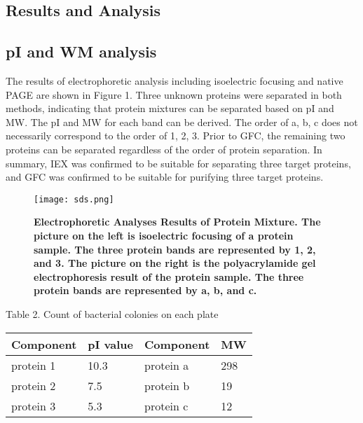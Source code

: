 \documentclass[a4paper,10pt]{article}
\begin{document}
\begin{multicols}{2}


\section{Results and Analysis}


\subsection{pI and WM analysis}
The results of electrophoretic analysis including isoelectric focusing and native PAGE are shown in Figure 1. Three unknown proteins were separated in both methods, indicating that protein mixtures can be separated based on pI and MW. The pI and MW for each band can be derived. The order of a, b, c does not necessarily correspond to the order of 1, 2, 3. Prior to GFC, the remaining two proteins can be separated regardless of the order of protein separation. In summary, IEX was confirmed to be suitable for separating three target proteins, and GFC was confirmed to be suitable for purifying three target proteins.


\begin{figure}[H]
\centering
\texttt{[image: sds.png]}
\caption{\scriptsize \textbf{Electrophoretic Analyses Results of Protein Mixture. The picture on the left is isoelectric focusing of a protein sample. The three protein bands are represented by 1, 2, and 3. The picture on the right is the polyacrylamide gel electrophoresis result of the protein sample. The three protein bands are represented by a, b, and c. }}
\label{fig1}
\end{figure}


\begin{center}
{Table 2. Count of bacterial colonies on each plate}
\vspace{0pt}
\begin{table}[H]
\setlength{\tabcolsep}{5pt}

\begin{tabular}{llll}
\toprule [1pt]
Component&pI value & Component & MW\\
\hline
protein 1 & 10.3 & protein a & 298\\
protein 2 & 7.5 & protein b & 19\\
protein 3 & 5.3 & protein c & 12\\
\bottomrule [1pt]
\end{tabular}
\end{table}
\end{center}



\end{multicols}
\end{document}
